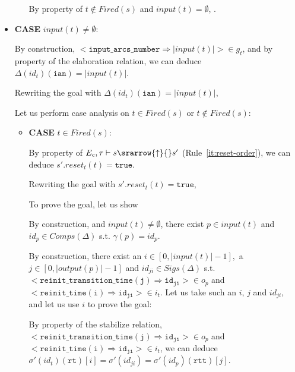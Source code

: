 \documentclass[dvipsnames,12pt]{article}
\begin{document}
\begin{niproof}
\begin{itemize}
\begin{itemize}
      By property of $t\notin{}Fired(s)$ and $input(t)=\emptyset$,
      .
    \end{itemize}
    
  \item \textbf{CASE} $input(t)\neq{}\emptyset$:

    By construction,
    ${<}\mathtt{input\_arcs\_number\Rightarrow{}}\vert{}input(t)\vert{>}\in{}g_t$,
    and by property of the elaboration relation, we can deduce
    $\Delta(id_t)(\texttt{ian})=\vert{}input(t)\vert$.

    Rewriting the goal with
    $\Delta(id_t)(\texttt{ian})=\vert{}input(t)\vert$,
    
    Let us perform case analysis on $t\in{}Fired(s)$ or
    $t\notin{}Fired(s)$:
    
    \begin{itemize}
    \item \textbf{CASE} $t\in{}Fired(s)$:
      
      By property of
      $E_c,\tau\vdash{}s\srarrow{\uparrow}{\fontsize{7}{7}\selectfont}s'$
      (Rule~\ref{it:reset-order}), we can deduce
      $s'.reset_t(t)=\mathtt{true}$.

      Rewriting the goal with $s'.reset_t(t)=\mathtt{true}$,

      To prove the goal, let us show

      By construction, and $input(t)\neq{}\emptyset$, there exist
      ${}p\in{}input(t)$ and $id_p\in{}Comps(\Delta)$
      s.t. $\gamma(p)=id_p$.

      \exP{}

      By construction, there exist an
      $i\in{}[0,\vert{}input(t)\vert-1],$ a
      $j\in[0,\vert{}output(p)\vert-1]$ and $id_{ji}\in{}Sigs(\Delta)$
      s.t.
      ${<}\mathtt{reinit\_transition\_time(j)\Rightarrow{}id_{ji}}{>}\in{}o_p$
      and\\
      ${<}\mathtt{reinit\_time(i)\Rightarrow{}id_{ji}}{>}\in{}i_t$. Let
      us take such an $i$, $j$ and $id_{ji}$, and let us use $i$ to
      prove the goal: 

      \noindent{}By property of the stabilize relation,
      ${<}\mathtt{reinit\_transition\_time(j)\Rightarrow{}id_{ji}}{>}\in{}o_p$
      and
      ${<}\mathtt{reinit\_time(i)\Rightarrow{}id_{ji}}{>}\in{}i_t$,
      we can deduce
      $\sigma'(id_t)(\texttt{rt})[i]=\sigma'(id_{ji})=\sigma'(id_p)(\texttt{rtt})[j]$.


\end{itemize}
\end{itemize}
\end{niproof}
\end{document}
